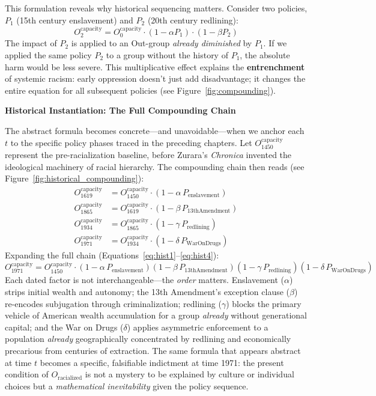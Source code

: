 \documentclass[12pt,openany]{book}
\begin{document}
This formulation reveals why historical sequencing matters. Consider two policies, $P_1$ (15th century enslavement) and $P_2$ (20th century redlining):
\[
O_2^{\text{capacity}} = O_0^{\text{capacity}} \cdot (1 - \alpha P_1) \cdot (1 - \beta P_2)
\]
The impact of $P_2$ is applied to an Out-group \textit{already diminished} by $P_1$. If we applied the same policy $P_2$ to a group without the history of $P_1$, the absolute harm would be less severe. This multiplicative effect explains the \textbf{entrenchment} of systemic racism: early oppression doesn't just add disadvantage; it changes the entire equation for all subsequent policies (see Figure~\ref{fig:compounding}).

\textbf{Historical Instantiation: The Full Compounding Chain}

The abstract formula becomes concrete---and unavoidable---when we anchor each $t$ to the specific policy phases traced in the preceding chapters. Let $O_{1450}^{\text{capacity}}$ represent the pre-racialization baseline, before Zurara's \textit{Chronica} invented the ideological machinery of racial hierarchy. The compounding chain then reads (see Figure~\ref{fig:historical_compounding}):
\begin{align}
O_{1619}^{\text{capacity}} &= O_{1450}^{\text{capacity}} \cdot (1 - \alpha\, P_{\text{enslavement}}) \label{eq:hist1}\\[4pt]
O_{1865}^{\text{capacity}} &= O_{1619}^{\text{capacity}} \cdot (1 - \beta\, P_{\text{13thAmendment}}) \label{eq:hist2}\\[4pt]
O_{1934}^{\text{capacity}} &= O_{1865}^{\text{capacity}} \cdot (1 - \gamma\, P_{\text{redlining}}) \label{eq:hist3}\\[4pt]
O_{1971}^{\text{capacity}} &= O_{1934}^{\text{capacity}} \cdot (1 - \delta\, P_{\text{WarOnDrugs}}) \label{eq:hist4}
\end{align}
Expanding the full chain (Equations~\ref{eq:hist1}--\ref{eq:hist4}):
\[
O_{1971}^{\text{capacity}} = O_{1450}^{\text{capacity}} \cdot (1-\alpha\, P_{\text{enslavement}})(1-\beta\, P_{\text{13thAmendment}})(1-\gamma\, P_{\text{redlining}})(1-\delta\, P_{\text{WarOnDrugs}})
\]
Each dated factor is not interchangeable---the \textit{order} matters. Enslavement ($\alpha$) strips initial wealth and autonomy; the 13th Amendment's exception clause ($\beta$) re-encodes subjugation through criminalization; redlining ($\gamma$) blocks the primary vehicle of American wealth accumulation for a group \textit{already} without generational capital; and the War on Drugs ($\delta$) applies asymmetric enforcement to a population \textit{already} geographically concentrated by redlining and economically precarious from centuries of extraction. The same formula that appears abstract at time $t$ becomes a specific, falsifiable indictment at time 1971: the present condition of $O_{\text{racialized}}$ is not a mystery to be explained by culture or individual choices but a \textit{mathematical inevitability} given the policy sequence.
\end{document}

